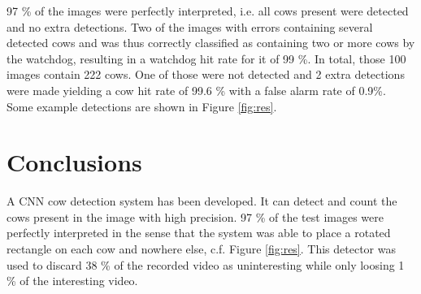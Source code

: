 \documentclass[10pt,a4paper,twocolumn]{article}
\begin{document}
97 \% of the images were perfectly interpreted, i.e. all cows present were detected and no extra detections. Two of the images with errors containing several detected cows and was thus correctly classified as containing two or more cows by the watchdog, resulting in a watchdog hit rate for it of 99 \%. In total, those 100 images contain 222 cows. One of those were not detected and 2 extra detections were made yielding a cow hit rate of 99.6 \% with a false alarm rate of 0.9\%. Some example detections are shown in Figure \ref{fig:res}.

\section{Conclusions}

A CNN cow detection system has been developed. It can detect and count the cows present in the image with high precision. 97 \% of the test images were perfectly interpreted in the sense that the system was able to place a rotated rectangle on each cow and nowhere else, c.f. Figure \ref{fig:res}. This detector was used to discard 38 \% of the recorded video as uninteresting while only loosing 1 \% of the interesting video.



\end{document}
